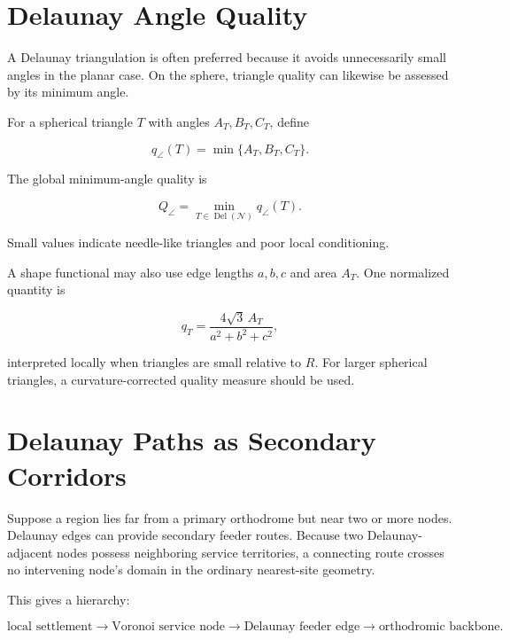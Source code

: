 \documentclass[11pt,fleqn]{book}
\numberwithin{equation}{chapter}
\theoremstyle{plain}
\theoremstyle{definition}
\theoremstyle{remark}
\newcommand{\Nset}{\mathcal{N}}
\newcommand{\Del}{\operatorname{Del}}
\begin{document}
\section{Delaunay Angle Quality}

A Delaunay triangulation is often preferred because it avoids unnecessarily small angles in the planar case. On the sphere, triangle quality can likewise be assessed by its minimum angle.

For a spherical triangle \(T\) with angles \(A_T,B_T,C_T\), define

\begin{equation}
    q_{\angle}(T)
    =
    \min\{A_T,B_T,C_T\}.
\end{equation}

The global minimum-angle quality is

\begin{equation}
    Q_{\angle}
    =
    \min_{T\in\Del(\Nset)}
    q_{\angle}(T).
\end{equation}

Small values indicate needle-like triangles and poor local conditioning.

A shape functional may also use edge lengths \(a,b,c\) and area \(A_T\). One normalized quantity is

\begin{equation}
    q_T
    =
    \frac{
      4\sqrt{3}\,A_T
    }{
      a^2+b^2+c^2
    },
\end{equation}

interpreted locally when triangles are small relative to \(R\). For larger spherical triangles, a curvature-corrected quality measure should be used.

\section{Delaunay Paths as Secondary Corridors}

Suppose a region lies far from a primary orthodrome but near two or more nodes. Delaunay edges can provide secondary feeder routes. Because two Delaunay-adjacent nodes possess neighboring service territories, a connecting route crosses no intervening node's domain in the ordinary nearest-site geometry.

This gives a hierarchy:

\begin{equation}
    \text{local settlement}
    \longrightarrow
    \text{Voronoi service node}
    \longrightarrow
    \text{Delaunay feeder edge}
    \longrightarrow
    \text{orthodromic backbone}.
\end{equation}
\end{document}
